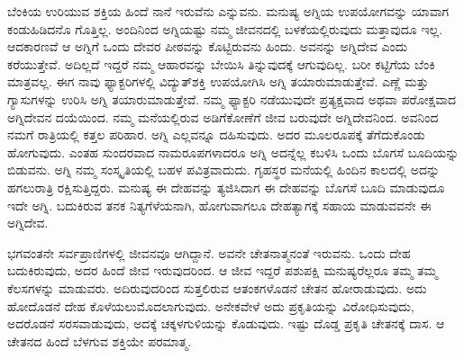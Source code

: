 ಬೆಂಕಿಯ ಉರಿಯುವ ಶಕ್ತಿಯ ಹಿಂದೆ ನಾನೆ ಇರುವೆನು ಎನ್ನುವನು. ಮನುಷ್ಯ ಅಗ್ನಿಯ ಉಪಯೋಗವನ್ನು ಯಾವಾಗ ಕಂಡುಹಿಡಿದನೊ ಗೊತ್ತಿಲ್ಲ. ಅಂದಿನಿಂದ ಅಗ್ನಿಯಷ್ಟು ನಮ್ಮ ಜೀವನದಲ್ಲಿ ಬಳಕೆಯಲ್ಲಿರುವುದು ಮತ್ತಾವುದೂ ಇಲ್ಲ. ಆದಕಾರಣವೆ ಆ ಅಗ್ನಿಗೆ ಒಂದು ದೇವರ ಪೀಠವನ್ನು ಕೊಟ್ಟಿರುವನು ಹಿಂದು. ಅವನನ್ನು ಅಗ್ನಿದೇವ ಎಂದು ಕರೆಯುತ್ತೇವೆ. ಅದಿಲ್ಲದೆ ಇದ್ದರೆ ನಮ್ಮ ಆಹಾರವನ್ನು ಬೇಯಿಸಿ ತಿನ್ನುವುದಕ್ಕೆ ಆಗುವುದಿಲ್ಲ. ಬರೀ ಕಟ್ಟಿಗೆಯ ಬೆಂಕಿ ಮಾತ್ರವಲ್ಲ. ಈಗ ನಾವು ಫ್ಯಾಕ್ಟರಿಗಳಲ್ಲಿ ವಿದ್ಯುತ್​ಶಕ್ತಿ ಉಪಯೋಗಿಸಿ ಅಗ್ನಿ ತಯಾರುಮಾಡುತ್ತೇವೆ. ಎಣ್ಣೆ ಮತ್ತು ಗ್ಯಾಸುಗಳನ್ನು ಉರಿಸಿ ಅಗ್ನಿ ತಯಾರುಮಾಡುತ್ತೇವೆ. ನಮ್ಮ ಫ್ಯಾಕ್ಟರಿ ನಡೆಯುವುದೇ ಪ್ರತ್ಯಕ್ಷವಾದ ಅಥವಾ ಪರೋಕ್ಷವಾದ ಅಗ್ನಿದೇವನ ದಯೆಯಿಂದ. ನಮ್ಮ ಮನೆಯಲ್ಲಿರುವ ಅಡಿಗೆಕೋಣೆಗೆ ಜೀವ ಬರುವುದೇ ಅಗ್ನಿದೇವನಿಂದ. ಅವನಿಂದ ನಮಗೆ ರಾತ್ರಿಯಲ್ಲಿ ಕತ್ತಲ ಪರಿಹಾರ. ಅಗ್ನಿ ಎಲ್ಲವನ್ನೂ ದಹಿಸುವುದು. ಅದರ ಮೂಲರೂಪಕ್ಕೆ ತೆಗೆದುಕೊಂಡು ಹೋಗುವುದು. ಎಂತಹ ಸುಂದರವಾದ ನಾಮರೂಪಗಳಾದರೂ ಅಗ್ನಿ ಅದನ್ನೆಲ್ಲ ಕಬಳಿಸಿ ಒಂದು ಬೊಗಸೆ ಬೂದಿಯನ್ನು ಬಿಡುವನು. ಅಗ್ನಿ ನಮ್ಮ ಸಂಸ್ಕೃತಿಯಲ್ಲಿ ಬಹಳ ಪವಿತ್ರವಾದುದು. ಗೃಹಸ್ಥರ ಮನೆಯಲ್ಲಿ ಹಿಂದಿನ ಕಾಲದಲ್ಲಿ ಅದನ್ನು ಹಗಲುರಾತ್ರಿ ರಕ್ಷಿಸುತ್ತಿದ್ದರು. ಮನುಷ್ಯ ಈ ದೇಹವನ್ನು ತ್ಯಜಿಸಿದಾಗ ಈ ದೇಹವನ್ನು ಬೊಗಸೆ ಬೂದಿ ಮಾಡುವುದೂ ಇದೇ ಅಗ್ನಿ. ಬದುಕಿರುವ ತನಕ ನಿತ್ಯಗೆಳೆಯನಾಗಿ, ಹೋಗುವಾಗಲೂ ದೇಹತ್ಯಾಗಕ್ಕೆ ಸಹಾಯ ಮಾಡುವವನೇ ಈ ಅಗ್ನಿದೇವ. 

ಭಗವಂತನೇ ಸರ್ವಪ್ರಾಣಿಗಳಲ್ಲಿ ಜೀವನವೂ ಆಗಿದ್ದಾನೆ. ಅವನೇ ಚೇತನಾತ್ಮನಂತೆ ಇರುವನು. ಒಂದು ದೇಹ ಬದುಕಿರುವುದು, ಅದರ ಹಿಂದೆ ಜೀವ ಇರುವುದರಿಂದ. ಆ ಜೀವ ಇದ್ದರೆ ಪಶುಪಕ್ಷಿ ಮನುಷ್ಯರೆಲ್ಲರೂ ತಮ್ಮ ತಮ್ಮ ಕೆಲಸಗಳನ್ನು ಮಾಡುವರು. ಅದಿರುವುದರಿಂದ ಸುತ್ತಲಿರುವ ಆತಂಕಗಳೊಡನೆ ಚೇತನ ಹೋರಾಡುವುದು. ಅದು ಹೋದೊಡನೆ ದೇಹ ಕೊಳೆಯಲು\break ಮೊದಲಾಗುವುದು. ಅನೇಕವೇಳೆ ಅದು ಪ್ರಕೃತಿಯನ್ನು ವಿರೋಧಿಸುವುದು, ಅದರೊಡನೆ ಸರಸವಾಡುವುದು, ಅದಕ್ಕೆ ಚಕ್ಕಳಗುಳಿಯನ್ನು ಕೊಡುವುದು. ಇಷ್ಟು ದೊಡ್ಡ ಪ್ರಕೃತಿ ಚೇತನಕ್ಕೆ ದಾಸ. ಆ ಚೇತನದ ಹಿಂದೆ ಬೆಳಗುವ ಶಕ್ತಿಯೇ ಪರಮಾತ್ಮ.

